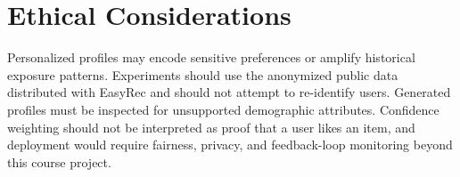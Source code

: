 \documentclass[11pt]{article}
\begin{document}
\section*{Ethical Considerations}

Personalized profiles may encode sensitive preferences or amplify historical exposure patterns.
Experiments should use the anonymized public data distributed with EasyRec and should not attempt to re-identify users.
Generated profiles must be inspected for unsupported demographic attributes.
Confidence weighting should not be interpreted as proof that a user likes an item, and deployment would require fairness, privacy, and feedback-loop monitoring beyond this course project.


\end{document}
